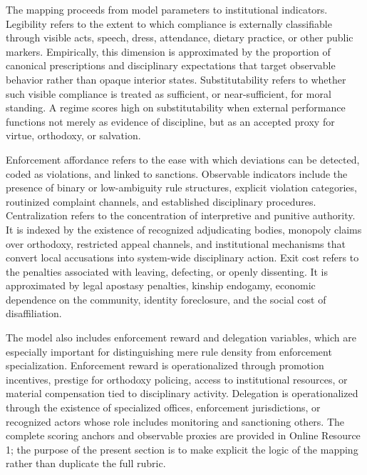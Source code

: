 \documentclass[12pt]{article}
\begin{document}
The mapping proceeds from model parameters to institutional indicators. Legibility refers to the extent to which compliance is externally classifiable through visible acts, speech, dress, attendance, dietary practice, or other public markers. Empirically, this dimension is approximated by the proportion of canonical prescriptions and disciplinary expectations that target observable behavior rather than opaque interior states. Substitutability refers to whether such visible compliance is treated as sufficient, or near-sufficient, for moral standing. A regime scores high on substitutability when external performance functions not merely as evidence of discipline, but as an accepted proxy for virtue, orthodoxy, or salvation.

Enforcement affordance refers to the ease with which deviations can be detected, coded as violations, and linked to sanctions. Observable indicators include the presence of binary or low-ambiguity rule structures, explicit violation categories, routinized complaint channels, and established disciplinary procedures. Centralization refers to the concentration of interpretive and punitive authority. It is indexed by the existence of recognized adjudicating bodies, monopoly claims over orthodoxy, restricted appeal channels, and institutional mechanisms that convert local accusations into system-wide disciplinary action. Exit cost refers to the penalties associated with leaving, defecting, or openly dissenting. It is approximated by legal apostasy penalties, kinship endogamy, economic dependence on the community, identity foreclosure, and the social cost of disaffiliation.

The model also includes enforcement reward and delegation variables, which are especially important for distinguishing mere rule density from enforcement specialization. Enforcement reward is operationalized through promotion incentives, prestige for orthodoxy policing, access to institutional resources, or material compensation tied to disciplinary activity. Delegation is operationalized through the existence of specialized offices, enforcement jurisdictions, or recognized actors whose role includes monitoring and sanctioning others. The complete scoring anchors and observable proxies are provided in Online Resource 1; the purpose of the present section is to make explicit the logic of the mapping rather than duplicate the full rubric.

\end{document}
